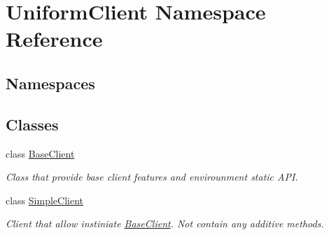 \hypertarget{namespace_uniform_client}{}\section{Uniform\+Client Namespace Reference}
\label{namespace_uniform_client}
\subsection*{Namespaces}
\begin{DoxyCompactItemize}
\end{DoxyCompactItemize}
\subsection*{Classes}
\begin{DoxyCompactItemize}
\item 
class \mbox{\hyperlink{class_uniform_client_1_1_base_client}{Base\+Client}}
\begin{DoxyCompactList}\small\item\em Class that provide base client features and envirounment static A\+PI. \end{DoxyCompactList}\item 
class \mbox{\hyperlink{class_uniform_client_1_1_simple_client}{Simple\+Client}}
\begin{DoxyCompactList}\small\item\em Client that allow instiniate \mbox{\hyperlink{class_uniform_client_1_1_base_client}{Base\+Client}}. Not contain any additive methods. \end{DoxyCompactList}\end{DoxyCompactItemize}
